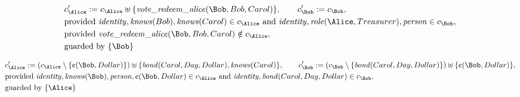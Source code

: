 \begin{align*}
&
c'_
{
\Alice
}
 := 
c_
{
\Alice
}
 \uplus 
\{
\mathit{\detokenize{
vote_redeem_alice
}}
(
\Bob
,
Bob
,
Carol
)
\}
, \qquad 
c'_
{
\Bob
}
 := 
c_
{
\Bob
}
,\\
&
\text{provided } 
\mathit{\detokenize{
identity
}}
,
\mathit{\detokenize{
knows
}}
(
Bob
)
,
\mathit{\detokenize{
knows
}}
(
Carol
)
 \in c_
{
\Alice
}
 \text{ and } 
\mathit{\detokenize{
identity
}}
,
\mathit{\detokenize{
role
}}
(
\Alice
,
Treasurer
)
,
\mathit{\detokenize{
person
}}
 \in c_
{
\Bob
}
,\\
&
\text{provided } 
\mathit{\detokenize{
vote_redeem_alice
}}
(
\Bob
,
Bob
,
Carol
)
 \notin c_
{
\Alice
}
,\\
&
\text{guarded by } \{
\Bob
\}
\end{align*}

\begin{align*}
&
c'_
{
\Alice
}
 := 
(c_
{
\Alice
}
 \setminus 
\{
\text{\textcent}
(
\Bob
,
Dollar
)
\}
) \uplus 
\{
\mathit{\detokenize{
bond
}}
(
Carol
,
Day
,
Dollar
)
,
\mathit{\detokenize{
knows
}}
(
Carol
)
\}
, \qquad 
c'_
{
\Bob
}
 := 
(c_
{
\Bob
}
 \setminus 
\{
\mathit{\detokenize{
bond
}}
(
Carol
,
Day
,
Dollar
)
\}
) \uplus 
\{
\text{\textcent}
(
\Bob
,
Dollar
)
\}
,\\
&
\text{provided } 
\mathit{\detokenize{
identity
}}
,
\mathit{\detokenize{
knows
}}
(
\Bob
)
,
\mathit{\detokenize{
person
}}
,
\text{\textcent}
(
\Bob
,
Dollar
)
 \in c_
{
\Alice
}
 \text{ and } 
\mathit{\detokenize{
identity
}}
,
\mathit{\detokenize{
bond
}}
(
Carol
,
Day
,
Dollar
)
 \in c_
{
\Bob
}
,\\
&
\text{guarded by } \{
\Alice
\}
\end{align*}

